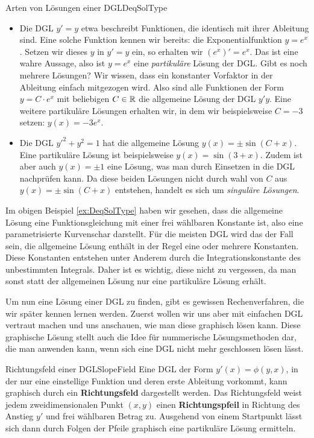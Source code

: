 \begin{example}{Arten von Lösungen einer DGL}{DeqSolType}
    \begin{itemize}
        \item Die DGL $y'=y$ etwa beschreibt Funktionen, die identisch mit ihrer Ableitung sind. Eine solche Funktion kennen wir bereits: die Exponentialfunktion $y=e^x$. Setzen wir dieses $y$ in $y'=y$ ein, so erhalten wir $(e^x)'=e^x$. Das ist eine wahre Aussage, also ist $y=e^x$ eine \emph{partikuläre} Lösung der DGL. Gibt es noch mehrere Lösungen? Wir wissen, dass ein konstanter Vorfaktor in der Ableitung einfach mitgezogen wird. Also sind alle Funktionen der Form $y=C\cdot e^x$ mit beliebigen $C\in\mathbb{R}$ die allgemeine Lösung der DGL $y'y$. Eine weitere partikuläre Lösungen erhalten wir, in dem wir beispielsweise $C=-3$ setzen: $y(x) = -3 e^x$.
        \item Die DGL $y'^2 + y^2 = 1$ hat die allgemeine Lösung $y(x) = \pm \sin(C+x)$. Eine partikuläre Lösung ist beispielsweise $y(x) = \sin(3+x)$. Zudem ist aber auch $y(x) = \pm 1$ eine Lösung, was man durch Einsetzen in die DGL nachprüfen kann. Da diese beiden Lösungen nicht durch wahl von $C$ aus  $y(x) = \pm \sin(C+x)$ entstehen, handelt es sich um \emph{singuläre Lösungen}.
    \end{itemize}
\end{example}

Im obigen Beispiel \ref{ex:DeqSolType} haben wir gesehen, dass die allgemeine Lösung eine Funktionsgleichung mit einer frei wählbaren Konstante ist, also eine parametrisierte Kurvenschar darstellt. Für die meisten DGL wird das der Fall sein, die allgemeine Lösung enthält in der Regel eine oder mehrere Konstanten. Diese Konstanten entstehen unter Anderem durch die Integrationskonstante des unbestimmten Integrals. Daher ist es wichtig, diese nicht zu vergessen, da man sonst statt der allgemeinen Lösung nur eine partikuläre Lösung erhält.

Um nun eine Lösung einer DGL zu finden, gibt es gewissen Rechenverfahren, die wir später kennen lernen werden. Zuerst wollen wir uns aber mit einfachen DGL vertraut machen und uns anschauen, wie man diese graphisch lösen kann. Diese graphische Lösung stellt auch die Idee für nummerische Lösungsmethoden dar, die man anwenden kann, wenn sich eine DGL nicht mehr geschlossen lösen lässt.

\begin{definition}{Richtungsfeld einer DGL}{SlopeField}
    Eine DGL der Form $y'(x) = \phi(y,x)$, in der nur eine einstellige Funktion und deren erste Ableitung vorkommt, kann graphisch durch ein \textbf{Richtungsfeld} dargestellt werden. Das Richtungsfeld weist jedem zweidimensionalen Punkt $(x,y)$ einen \textbf{Richtungspfeil} in Richtung des Anstieg $y'$ und frei wählbaren Betrag zu. Ausgehend von einem Startpunkt lässt sich dann durch Folgen der Pfeile graphisch eine partikuläre Lösung ermitteln.
\end{definition}

